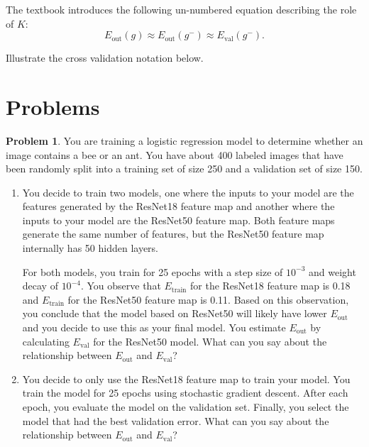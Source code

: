 \documentclass[10pt]{exam}
\theoremstyle{definition}
\newtheorem{problem}{Problem}
\newcommand{\Eout}{E_{\text{out}}}
\newcommand{\Etrain}{E_{\text{train}}}
\newcommand{\Eval}{E_{\text{val}}}
\begin{document}
The textbook introduces the following un-numbered equation describing the role of $K$:
\begin{equation*}
    \Eout(g) \approx \Eout(g^-) \approx \Eval(g^-).
\end{equation*}

\vspace{3in}
Illustrate the cross validation notation below.

\newpage
\section*{Problems}
\begin{problem}
    You are training a logistic regression model to determine whether an image contains a bee or an ant.
    You have about 400 labeled images that have been randomly split into a training set of size 250 and a validation set of size 150.

    \begin{enumerate}
        \item 
            You decide to train two models, one where the inputs to your model are the features generated by the ResNet18 feature map and another where the inputs to your model are the ResNet50 feature map.
            Both feature maps generate the same number of features,
            but the ResNet50 feature map internally has 50 hidden layers.

            For both models, you train for 25 epochs with a step size of $10^{-3}$ and weight decay of $10^{-4}$.
            You observe that $\Etrain$ for the ResNet18 feature map is 0.18 and $\Etrain$ for the ResNet50 feature map is 0.11.
            Based on this observation, you conclude that the model based on ResNet50 will likely have lower $\Eout$ and you decide to use this as your final model.
            You estimate $\Eout$ by calculating $\Eval$ for the ResNet50 model.
            What can you say about the relationship between $\Eout$ and $\Eval$?


            \vspace{3in}
        \item
            You decide to only use the ResNet18 feature map to train your model.
            You train the model for 25 epochs using stochastic gradient descent.
            After each epoch, you evaluate the model on the validation set.
            Finally, you select the model that had the best validation error.
            What can you say about the relationship between $\Eout$ and $\Eval$?
    \end{enumerate}
\end{problem}
\end{document}
